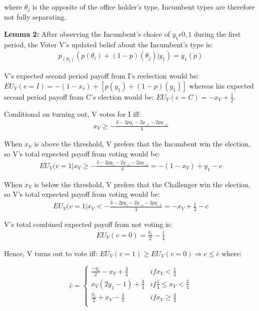 \documentclass[12pt]{paper}
\begin{document}
where $\theta_j$ is the opposite of the office holder’s type. Incumbent types are therefore not fully separating.

\textbf{Lemma 2:}  After observing the Incumbent’s choice of $y_1 \epsilon {0,1}$ during the first period, the Voter V’s updated belief about the Incumbent’s type is: 
\begin{gather}
p_{(\theta_I)}(p(\theta_i ) + (1 - p)(\theta_j ) | y_1 )=y_1(p)
\end{gather}

V’s expected second period payoff from I’s reelection would be: $EU_V (e=I) = -(1 - x_v ) + [p(y_1 ) + (1 - p)(y_1 )]$ whereas his expected second period payoff from C’s election would be: $EU_V (e=C) = - x_V + \frac{1}{2}$. 

Conditional on turning out, V votes for I iff: 
\begin{gather}
x_V \geq -\frac{3 - 2py_1 - 2y_{-1} - 2py_{-1}}{4}
\end{gather}

When $x_V$ is above the threshold, V prefers that the Incumbent win the election, so V’s total expected payoff from voting would be:
\begin{gather}
 EU_V (v=1 | x_V \geq -\frac{3 - 2py_1 - 2y_{-1} - 2py_{-1}}{4} =
  - (1 - x_V ) + y_1 - c
\end{gather}

When $x_V$ is below the threshold, V prefers that the Challenger win the election, so V’s total expected payoff from voting would be:
\begin{gather}
 EU_V (v=1 | x_V < -\frac{3 - 2py_1 - 2y_{-1} - 2py_{-1}}{4} = 
  -x_V + \frac{1}{2} - c
\end{gather}

V’s total combined expected payoff from not voting is:
\begin{gather}
EU_V (v=0) = 
\frac{y_1}{2} - \frac{1}{4}
\end{gather}

Hence, V turns out to vote iff: $EU_V (v=1) \geq EU_V (v=0) \Rightarrow c \leq \bar{c}$ where:

\begin{equation}
\bar{c} =
\begin{cases}
\frac{-y_1}{2} - x_V + \frac{3}{4} & if x_V < \frac{1}{4} \\
x_V (2y_1 - 1) + \frac{3}{4}     & if \frac{1}{4} \leq x_V < \frac{3}{4}  \\
\frac{y_1}{2} + x_V - \frac{3}{4}     & if x_V \geq \frac{3}{4}  \\
\end{cases}
\end{equation}
\end{document}
